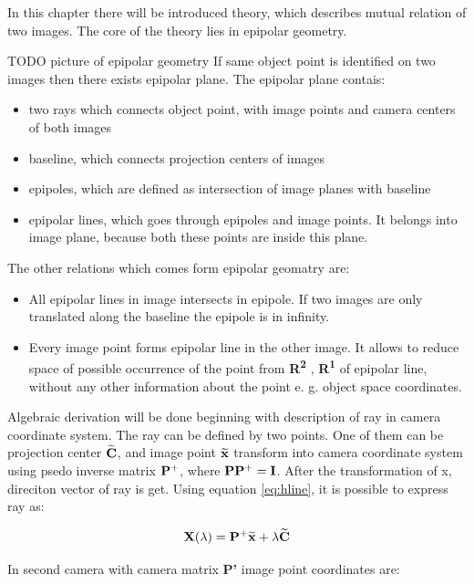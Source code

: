 \documentclass[a4paper,12pt]{report}
\newcommand{\ematr}[1]{
{\bf #1}
}
\newcommand{\ehvect}[1]{
{\bf \widetilde{#1}}
}
\newcommand{\escal}[1]{
{\it #1}
}
\newcommand{\eucl}[1]{
{\bf R\textsuperscript{#1}}
}
\begin{document}
In this chapter there will be introduced theory, which describes mutual relation of two images. 
The core of the theory lies in epipolar geometry.

TODO picture of epipolar geometry
If same object point is identified on two images then there exists epipolar plane.
The epipolar plane contais:

\begin{itemize}
\item two rays which connects object point, with image points and camera centers of both images
\item baseline, which connects projection centers of images
\item epipoles, which are defined as intersection of image planes with baseline
\item epipolar lines, which goes through epipoles and image points. It belongs into image plane, 
      because both these points are inside this plane.  
\end{itemize}


The other relations which comes form epipolar geomatry are:

\begin{itemize}
\item All epipolar lines in image intersects in epipole. If two images are only translated along the baseline 
     the epipole is in infinity.
\item Every image point forms epipolar line in the other image. It allows to reduce space of possible occurrence of the point 
      from \eucl{2}, \eucl{1} of epipolar line, without any other information about the point e. g. object space coordinates. 

\end{itemize}

Algebraic derivation will be done beginning with description of ray in camera coordinate system.
The ray can be defined by two points.
One of them can be projection center $\ehvect{C}$, and 
image point $\ehvect{x}$ transform into camera coordinate system using psedo inverse matrix $\ematr{P}^{+}$, 
where $\ematr{P}\ematr{P}^{+} = \ematr{I}$. After the transformation of x, direciton vector of ray is get.
Using equation \eqref{eq:hline}, it is possible to express ray as:

\begin{equation}
\ematr{X}(\escal{\lambda}) = \ematr{P}^{+}\ehvect{x} + \escal{\lambda}\ehvect{C}
\end{equation}

In second camera with camera matrix \ematr{P'} image point coordinates are:
\end{document}
